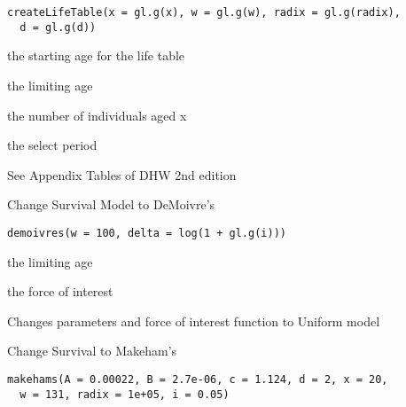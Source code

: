 \documentclass[a4paper]{book}
\begin{document}
%
\begin{Usage}
\begin{verbatim}
createLifeTable(x = gl.g(x), w = gl.g(w), radix = gl.g(radix),
  d = gl.g(d))
\end{verbatim}
\end{Usage}
%
\begin{Arguments}
\begin{ldescription}
\item[\code{x}] the starting age for the life table

\item[\code{w}] the limiting age

\item[\code{radix}] the number of individuals aged x

\item[\code{d}] the select period
\end{ldescription}
\end{Arguments}
%
\begin{Details}\relax
See Appendix Tables of DHW 2nd edition
\end{Details}
%
\begin{Description}\relax
Change Survival Model to DeMoivre's
\end{Description}
%
\begin{Usage}
\begin{verbatim}
demoivres(w = 100, delta = log(1 + gl.g(i)))
\end{verbatim}
\end{Usage}
%
\begin{Arguments}
\begin{ldescription}
\item[\code{w}] the limiting age

\item[\code{delta}] the force of interest
\end{ldescription}
\end{Arguments}
%
\begin{Details}\relax
Changes parameters and force of interest function to Uniform model
\end{Details}
%
\begin{Description}\relax
Change Survival to Makeham's
\end{Description}
%
\begin{Usage}
\begin{verbatim}
makehams(A = 0.00022, B = 2.7e-06, c = 1.124, d = 2, x = 20,
  w = 131, radix = 1e+05, i = 0.05)
\end{verbatim}
\end{Usage}
\end{document}
